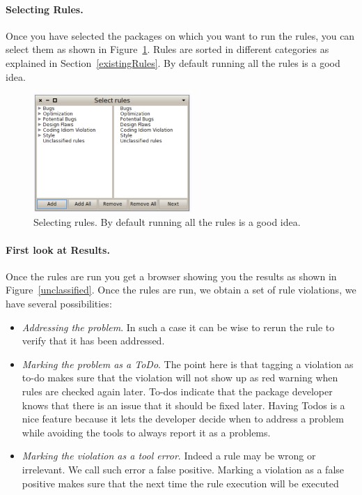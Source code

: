 \documentclass[a4paper,10pt,twoside]{book}
\begin{document}
\paragraph{Selecting Rules.}
Once you have selected the packages on which you want to run the rules, you can select them as shown in Figure~\ref{ruleselection}. Rules are sorted in different categories as explained in Section~\ref{existingRules}. By default running all the rules is a good idea.


\begin{figure}[h]
\centering
\includegraphics[width=6cm]{selectingRules}
\caption{Selecting rules. By default running all the rules is a good idea. \label{ruleselection}}
\end{figure}


\paragraph{First look at Results.} Once the rules are run you get a browser showing you the results as shown in Figure~\ref{unclassified}. Once the rules are run, we obtain a set of rule violations, we have several possibilities:

\begin{itemize}
\item \emph{Addressing the problem}. In such a case it can be wise to rerun the rule to verify that it has been addressed.

\item \emph{Marking the problem as a ToDo}. The point here is that tagging a violation as to-do makes sure that the violation will not show up as red warning when rules are checked again later. To-dos indicate that the package developer knows that there is an issue that it should be fixed later. 
Having Todos is a nice feature because it lets the developer decide when to address a problem while avoiding the tools to always report it as a problems. 

\item \emph{Marking the violation as a tool error}. Indeed a rule may be wrong or irrelevant. We call such error a false positive. Marking a violation as a false positive makes sure that the next time the rule execution will be executed
\end{itemize}
\end{document}
